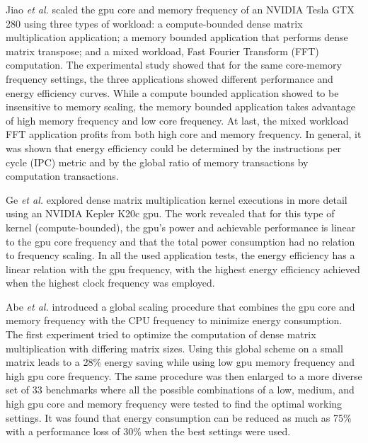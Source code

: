 Jiao \textit{et al.} \cite{jiao_power_2010} scaled the \acrshort{gpu} core and memory frequency of an NVIDIA Tesla GTX 280 using three types of workload: a compute-bounded dense matrix multiplication application; a memory bounded application that performs dense matrix transpose; and a mixed workload, Fast Fourier Transform (FFT) computation. The experimental study showed that for the same core-memory frequency settings, the three applications showed different performance and energy efficiency curves. While a compute bounded application showed to be insensitive to memory scaling, the memory bounded application takes advantage of high memory frequency and low core frequency. At last, the mixed workload FFT application profits from both high core and memory frequency. In general, it was shown that energy efficiency could be determined by the instructions per cycle (IPC) metric and by the global ratio of memory transactions by computation transactions.

Ge \textit{et al.} \cite{ge_effects_2013} explored dense matrix multiplication kernel executions in more detail using an NVIDIA Kepler K20c \acrshort{gpu}.  The work revealed that for this type of kernel (compute-bounded), the \acrshort{gpu}'s power and achievable performance is linear to the \acrshort{gpu} core frequency and that the total power consumption had no relation to frequency scaling. In all the used application tests, the energy efficiency has a linear relation with the \acrshort{gpu} frequency, with the highest energy efficiency achieved when the highest clock frequency was employed.

Abe \textit{et al.} \cite{abe_power_2012} introduced a global scaling procedure that combines the \acrshort{gpu} core and memory frequency with the CPU frequency to minimize energy consumption. The first experiment tried to optimize the computation of dense matrix multiplication with differing matrix sizes. Using this global scheme on a small matrix leads to a 28\% energy saving while using low \acrshort{gpu} memory frequency and high \acrshort{gpu} core frequency. The same procedure was then enlarged to a more diverse set of 33 benchmarks where all the possible combinations of a low, medium, and high \acrshort{gpu} core and memory frequency were tested to find the optimal working settings. It was found that energy consumption can be reduced as much as 75\% with a performance loss of 30\% when the best settings were used. 

